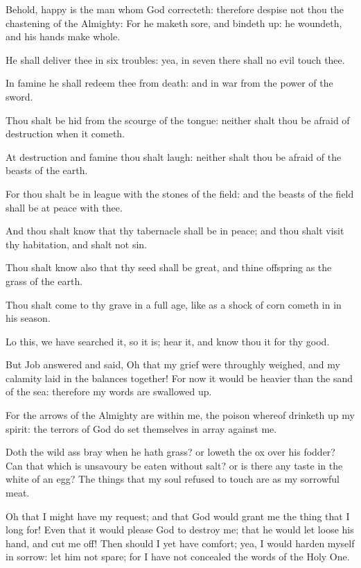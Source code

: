 \Verse Behold, happy is the man whom God correcteth: therefore despise not thou the chastening of the Almighty: \Verse For he maketh sore, and bindeth up: he woundeth, and his hands make whole.

\Verse He shall deliver thee in six troubles: yea, in seven there shall no evil touch thee.

\Verse In famine he shall redeem thee from death: and in war from the power of the sword.

\Verse Thou shalt be hid from the scourge of the tongue: neither shalt thou be afraid of destruction when it cometh.

\Verse At destruction and famine thou shalt laugh: neither shalt thou be afraid of the beasts of the earth.

\Verse For thou shalt be in league with the stones of the field: and the beasts of the field shall be at peace with thee.

\Verse And thou shalt know that thy tabernacle shall be in peace; and thou shalt visit thy habitation, and shalt not sin.

\Verse Thou shalt know also that thy seed shall be great, and thine offspring as the grass of the earth.

\Verse Thou shalt come to thy grave in a full age, like as a shock of corn cometh in in his season.

\Verse Lo this, we have searched it, so it is; hear it, and know thou it for thy good.


\Chapter
\Verse But Job answered and said, \Verse Oh that my grief were throughly weighed, and my calamity laid in the balances together!  \Verse For now it would be heavier than the sand of the sea: therefore my words are swallowed up.

\Verse For the arrows of the Almighty are within me, the poison whereof drinketh up my spirit: the terrors of God do set themselves in array against me.

\Verse Doth the wild ass bray when he hath grass? or loweth the ox over his fodder?  \Verse Can that which is unsavoury be eaten without salt? or is there any taste in the white of an egg?  \Verse The things that my soul refused to touch are as my sorrowful meat.

\Verse Oh that I might have my request; and that God would grant me the thing that I long for!  \Verse Even that it would please God to destroy me; that he would let loose his hand, and cut me off!  \Verse Then should I yet have comfort; yea, I would harden myself in sorrow: let him not spare; for I have not concealed the words of the Holy One.


